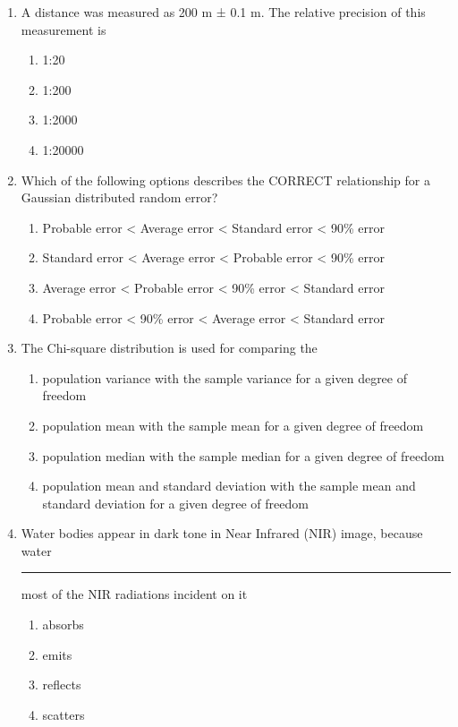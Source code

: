 \documentclass[12pt]{article}
\begin{document}
\begin{enumerate}
\item A distance was measured as 200 m ± 0.1 m. The relative precision of this
measurement is 
\begin{enumerate}
    \item1:20  
   \item 1:200  
   \item 1:2000 
   \item 1:20000  
\end{enumerate}

\item Which of the following options describes the CORRECT relationship for a
Gaussian distributed random error? 
\begin{enumerate}
    \item Probable error < Average error < Standard error < 90\% error 
   \item Standard error < Average error < Probable error < 90\% error  
   \item Average error < Probable error < 90\% error < Standard error 
   \item Probable error < 90\% error < Average error < Standard error  
\end{enumerate}

\item The Chi-square distribution is used for comparing the

\begin{enumerate}
    \item population variance with the sample variance for a given degree of freedom 
   \item population mean with the sample mean for a given degree of freedom 
   \item population median with the sample median for a given degree of freedom  
   \item population mean and standard deviation with the sample mean and standard
deviation for a given degree of freedom

\end{enumerate}

\item Water bodies appear in dark tone in Near Infrared (NIR) image, because water
\rule{2cm}{0.15mm} most of the NIR radiations incident on it

\begin{enumerate}
    \item absorbs 
   \item emits  
   \item reflects 
   \item scatters
\end{enumerate}


\end{enumerate}
\end{document}
